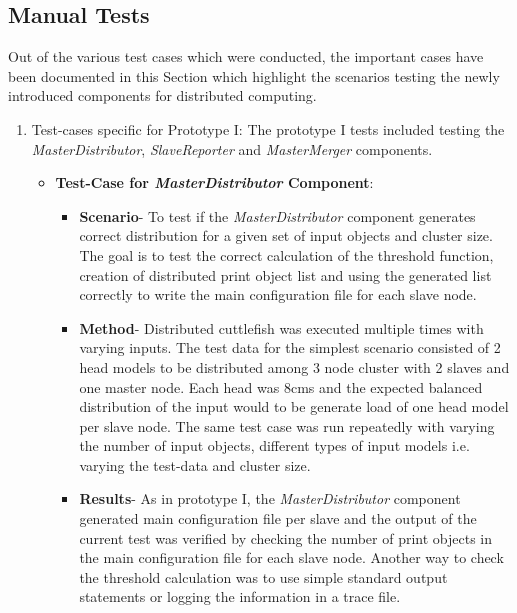 \subsection{Manual Tests} \label{ManualTests}

Out of the various test cases which were conducted, the important cases have been documented in this Section which highlight the scenarios testing the newly introduced components for distributed computing. 

\begin{enumerate}
\item{Test-cases specific for Prototype I}: The prototype I tests included testing the \textit{MasterDistributor}, \textit{SlaveReporter} and \textit{MasterMerger} components. 
\begin{itemize}
\item{\textbf{Test-Case for \textit{MasterDistributor} Component}}:

\begin{itemize}
\item{\textbf{Scenario}}- To test if the \textit{MasterDistributor} component generates correct distribution for a given set of input objects and cluster size. The goal is to test the correct calculation of the threshold function, creation of distributed print object list and using the generated list correctly to write the main configuration file for each slave node.  
\item{\textbf{Method}}- Distributed cuttlefish was executed multiple times with varying inputs. The test data for the simplest scenario consisted of 2 head models to be distributed among 3 node cluster with 2 slaves and one master node. Each head was 8cms and the expected balanced distribution of the input would to be generate load of one head model per slave node. The same test case was run repeatedly with varying the number of input objects, different types of input models i.e. varying the test-data and cluster size. 
\item{\textbf{Results}}- As in prototype I, the \textit{MasterDistributor} component generated main configuration file per slave and the output of the current test was verified by checking the number of print objects in the main configuration file for each slave node. Another way to check the threshold calculation was to use simple standard output statements or logging the information in a trace file.
\end{itemize}


\end{itemize}
\end{enumerate}
